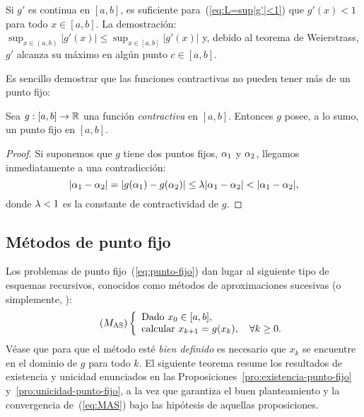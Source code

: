 \begin{remark}
  Si $g'$ es continua en $[a,b]$, es suficiente
  para~(\ref{eq:L=sup|g'|<1}) que $g'(x)<1$ para todo $x\in[a,b]$.
  La demostración: $\sup_{x\in(a,b)}|g'(x)| \le \sup_{x\in[a,b]}
  |g'(x)|$ y, debido al teorema de Weierstrass, $g'$ alcanza su máximo
  en algún punto $c\in [a,b]$.
  \label{rk:3}
\end{remark}
Es sencillo demostrar que las funciones contractivas no pueden tener
más de un punto fijo:

\begin{proposition}
  \label{pro:unicidad-punto-fijo}
  Sea $g:[a,b]\to\operatorname{{\mathbb R}}$ una función \emph{contractiva} en
  $[a,b]$. Entonces $g$ posee, a lo sumo, un punto fijo en $[a,b]$.
\end{proposition}

\begin{proof}
  Si suponemos que $g$ tiene dos puntos fijos, $\alpha_1$ y
  $\alpha_2$, llegamos inmediatamente a una contradicción:
  $$
  |\alpha_1-\alpha_2| = |g(\alpha_1)-g(\alpha_2)| \le \lambda |\alpha_1 -
  \alpha_2| < |\alpha_1-\alpha_2|,$$
  donde $\lambda<1$ es la constante de contractividad de $g$.
\end{proof}

\subsection*{Métodos de punto fijo}

Los problemas de punto fijo~(\ref{eq:punto-fijo}) dan lugar al
siguiente tipo de esquemas recursivos, conocidos como métodos de
aproximaciones sucesivas (o simplemente, ):
\begin{equation}
  \tag{$M_{\text{AS}}$}
  \left\{
    \begin{array}{l}
      \text{Dado } x_0\in [a,b], \\
      \text{calcular } x_{k+1}=g(x_k), \quad \forall k\ge 0.
    \end{array}
  \right.
  \label{eq:MAS}
\end{equation}
Véase que para que el método esté \textit{bien definido} es necesario
que $x_k$ se encuentre en el dominio de $g$ para todo $k$.
El siguiente teorema resume los resultados de existencia y unicidad
enunciados en las Proposiciones~\ref{pro:existencia-punto-fijo}
y~\ref{pro:unicidad-punto-fijo}, a la vez que garantiza el buen
planteamiento y la convergencia de~(\ref{eq:MAS}) bajo las hipótesis
de aquellas proposiciones.

